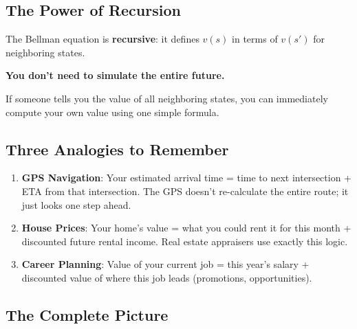 \documentclass[journal, onecolumn]{IEEEtran}
\newcommand{\vocab}[1]{\textbf{\textcolor{Garnet}{#1}}}
\begin{document}
\subsection{The Power of Recursion}

The Bellman equation is \vocab{recursive}: it defines $v(s)$ in terms of $v(s')$ for neighboring states.

\begin{tcolorbox}[memorybox={The Bootstrap Principle}]
\textbf{You don't need to simulate the entire future.}

If someone tells you the value of all neighboring states, you can immediately compute your own value using one simple formula.
\end{tcolorbox}

\subsection{Three Analogies to Remember}

\begin{enumerate}
    \item \textbf{GPS Navigation}: Your estimated arrival time = time to next intersection + ETA from that intersection. The GPS doesn't re-calculate the entire route; it just looks one step ahead.

    \item \textbf{House Prices}: Your home's value = what you could rent it for this month + discounted future rental income. Real estate appraisers use exactly this logic.

    \item \textbf{Career Planning}: Value of your current job = this year's salary + discounted value of where this job leads (promotions, opportunities).
\end{enumerate}

\subsection{The Complete Picture}
\end{document}
